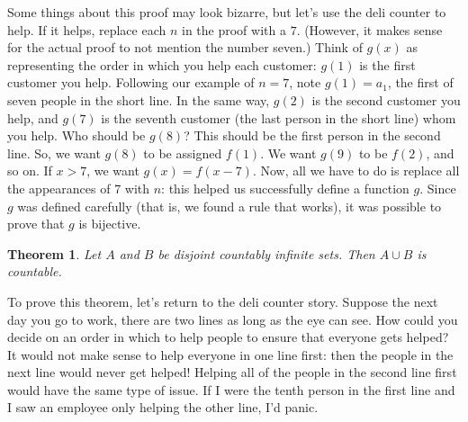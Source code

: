 \documentclass{book}
\newcounter{ekcounter}%
\theoremstyle{ekimcustom}
\newtheorem{theorem}[ekcounter]{Theorem}
\begin{document}
Some things about this proof may look bizarre, but let's use the deli counter to help. If it helps, replace each $n$ in the proof with a $7$. (However, it makes sense for the actual proof to not mention the number seven.) Think of $g(x)$ as representing the order in which you help each customer: $g(1)$ is the first customer you help. Following our example of $n=7$, note $g(1)=a_1$, the first of seven people in the short line. In the same way, $g(2)$ is the second customer you help, and $g(7)$ is the seventh customer (the last person in the short line) whom you help. Who should be $g(8)$? This should be the first person in the second line. So, we want $g(8)$ to be assigned $f(1)$. We want $g(9)$ to be $f(2)$, and so on. If $x>7$, we want $g(x)=f(x-7)$. Now, all we have to do is replace all the appearances of $7$ with $n$: this helped us successfully define a function $g$. Since $g$ was defined carefully (that is, we found a rule that works), it was possible to prove that $g$ is bijective.

\begin{theorem}\label{theorem:disjoint-countably-infinite-sets}
Let $A$ and $B$ be disjoint countably infinite sets. Then $A \cup B$ is countable.
\end{theorem}
To prove this theorem, let's return to the deli counter story. Suppose the next day you go to work, there are two lines as long as the eye can see. How could you decide on an order in which to help people to ensure that everyone gets helped? It would not make sense to help everyone in one line first: then the people in the next line would never get helped! Helping all of the people in the second line first would have the same type of issue. If I were the tenth person in the first line and I saw an employee only helping the other line, I'd panic.
\end{document}

